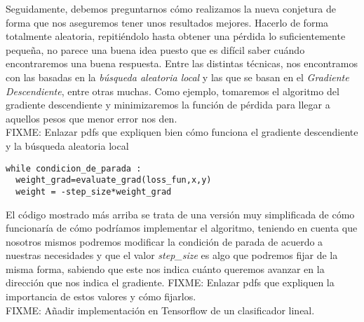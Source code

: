 Seguidamente, debemos preguntarnos cómo realizamos la nueva conjetura de forma que nos aseguremos tener unos resultados mejores. Hacerlo de forma totalmente aleatoria, repitiéndolo hasta obtener una pérdida lo suficientemente pequeña, no parece una buena idea puesto que es difícil saber cuándo encontraremos una buena respuesta. Entre las distintas técnicas, nos encontramos con las basadas en la \emph{búsqueda aleatoria local} y las que se basan en el \emph{Gradiente Descendiente}, entre otras muchas. Como ejemplo, tomaremos el algoritmo del gradiente descendiente y minimizaremos la función de pérdida para llegar a aquellos pesos que menor error nos den.\\

FIXME: Enlazar pdfs que expliquen bien cómo funciona el gradiente descendiente y la búsqueda aleatoria local \\
\lstset{language=Python}
\begin{lstlisting}[frame=single]
while condicion_de_parada :
  weight_grad=evaluate_grad(loss_fun,x,y)
  weight = -step_size*weight_grad

\end{lstlisting}

El código mostrado más arriba se trata de una versión muy simplificada de cómo funcionaría de cómo podríamos implementar el algoritmo, teniendo en cuenta que nosotros mismos podremos modificar la condición de parada de acuerdo a nuestras necesidades y que el valor \emph{step\_size} es algo que podremos fijar de la misma forma, sabiendo que este nos indica cuánto queremos avanzar en la dirección que nos indica el gradiente. FIXME: Enlazar pdfs que expliquen la importancia de estos valores y cómo fijarlos.\\

FIXME: Añadir implementación en Tensorflow de un clasificador lineal.

